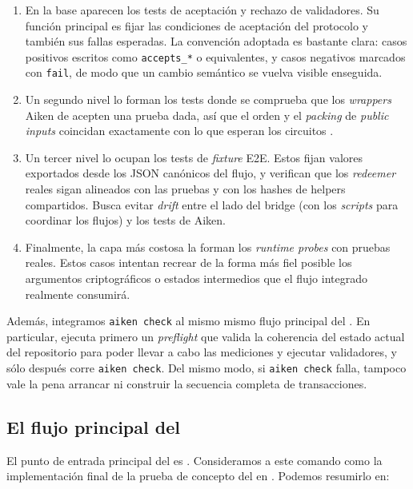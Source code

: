 \begin{enumerate}[noitemsep]
  \item En la base aparecen los tests de aceptación y rechazo de validadores. Su función principal es fijar las condiciones de aceptación del protocolo y también sus fallas esperadas. La convención adoptada es bastante clara: casos positivos escritos como \texttt{accepts\_*} o equivalentes, y casos negativos marcados con \texttt{fail}, de modo que un cambio semántico se vuelva visible enseguida.
  \item Un segundo nivel lo forman los tests donde se comprueba que los \textit{wrappers} Aiken de \Groth acepten una prueba dada, así que el orden y el \textit{packing} de \textit{public inputs} coincidan exactamente con lo que esperan los circuitos \Groth.
  \item Un tercer nivel lo ocupan los tests de \textit{fixture} E2E. Estos fijan valores exportados desde los JSON canónicos del flujo, y verifican que los \textit{redeemer} reales sigan alineados con las pruebas y con los hashes de helpers compartidos. Busca evitar \textit{drift} entre el lado \Offchain del bridge (con los \textit{scripts} para coordinar los flujos) y los tests de Aiken.
  \item Finalmente, la capa más costosa la forman los \textit{runtime probes} con pruebas reales. Estos casos intentan recrear de la forma más fiel posible los argumentos criptográficos o estados intermedios que el flujo integrado realmente consumirá.
\end{enumerate}

Además, integramos \texttt{aiken check} al mismo mismo flujo principal del \zkBridge. En particular, \BridgeRunStrictCommand ejecuta primero un \textit{preflight} que valida la coherencia del estado actual del repositorio para poder llevar a cabo las mediciones y ejecutar validadores, y sólo después corre \texttt{aiken check}. Del mismo modo, si \texttt{aiken check} falla, tampoco vale la pena arrancar \Dolos ni construir la secuencia completa de transacciones.

\subsection{El flujo principal del \zkBridge}

El punto de entrada principal del \zkBridge es \BridgeRunStrictCommand. Consideramos a este comando como la implementación final de la prueba de concepto del \zkBridge en \Cardano. Podemos resumirlo en:

